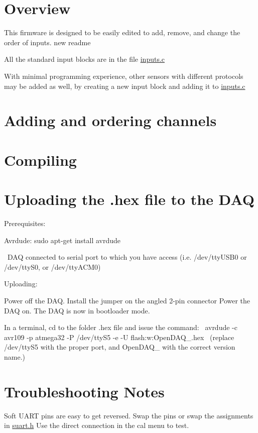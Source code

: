 \hypertarget{index_Overview}{}\section{Overview}\label{index_Overview}
This firmware is designed to be easily edited to add, remove, and change the order of inputs. new readme\par
All the standard input blocks are in the file \hyperlink{inputs_8c}{inputs.\-c} \par
With minimal programming experience, other sensors with different protocols may be added as well, by creating a new input block and adding it to \hyperlink{inputs_8c}{inputs.\-c} \par
\hypertarget{index_two}{}\section{Adding and ordering channels}\label{index_two}
 \hypertarget{index_three}{}\section{Compiling}\label{index_three}
 \hypertarget{index_four}{}\section{Uploading the .\-hex file to the D\-A\-Q}\label{index_four}
Prerequisites\-: \par
 
\begin{DoxyItemize}
\item Avrdude\-: sudo apt-\/get install avrdude \par
  
\item ~D\-A\-Q connected to serial port to which you have access (i.\-e. /dev/tty\-U\-S\-B0 or /dev/tty\-S0, or /dev/tty\-A\-C\-M0) \par
  
\end{DoxyItemize}Uploading\-:\par
 
\begin{DoxyItemize}
\item Power off the D\-A\-Q. Install the jumper on the angled 2-\/pin connector Power the D\-A\-Q on. The D\-A\-Q is now in bootloader mode. 
\item In a terminal, cd to the folder .hex file and issue the command\-:~  avrdude -\/c avr109 -\/p atmega32 -\/\-P /dev/tty\-S5 -\/e -\/\-U flash\-:w\-:Open\-D\-A\-Q\-\_.\-hex~ (replace /dev/tty\-S5 with the proper port, and Open\-D\-A\-Q\-\_ with the correct version name.)  
\end{DoxyItemize}\hypertarget{index_fourptfive}{}\section{Troubleshooting Notes}\label{index_fourptfive}
Soft U\-A\-R\-T pins are easy to get reversed. Swap the pins or swap the assignments in \hyperlink{suart_8h}{suart.\-h} Use the direct connection in the cal menu to test.

